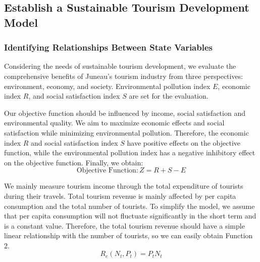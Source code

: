 \documentclass[12pt]{article}  %
\begin{document}
\subsection{Establish a Sustainable Tourism Development Model}
\subsubsection{Identifying Relationships Between State Variables}
Considering the needs of sustainable tourism development, we evaluate the comprehensive benefits of Juneau's tourism industry from three perspectives: environment, economy, and society. Environmental pollution index $E$, economic index $R$, and social satisfaction index $S$ are set for the evaluation.

Our objective function should be influenced by income, social satisfaction and environmental quality. We aim to maximize economic effects and social satisfaction while minimizing environmental pollution. Therefore, the economic index $R$ and social satisfaction index $S$ have positive effects on the objective function, while the environmental pollution index has a negative inhibitory effect on the objective function. Finally, we obtain:
\begin{equation}
	\text{Objective\ Function}:Z=R+S-E
\end{equation}

We mainly measure tourism income through the total expenditure of tourists during their travels. Total tourism revenue is mainly affected by per capita consumption and the total number of tourists. To simplify the model, we assume that per capita consumption will not fluctuate significantly in the short term and is a constant value. Therefore, the total tourism revenue should have a simple linear relationship with the number of tourists, so we can easily obtain Function 2.
\begin{equation}
    R_{e}(N_{t},P_{t}) = P_{t}N_{t}
\end{equation}
\end{document}
